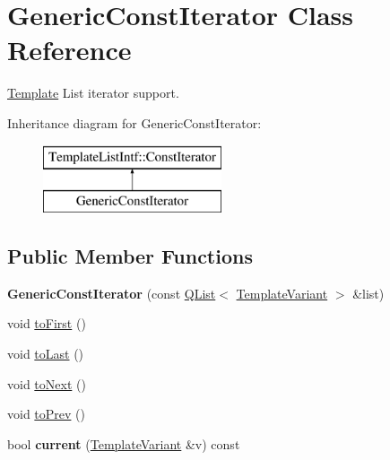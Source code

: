 \hypertarget{class_generic_const_iterator}{}\section{Generic\+Const\+Iterator Class Reference}
\label{class_generic_const_iterator}


\mbox{\hyperlink{class_template}{Template}} List iterator support.  


Inheritance diagram for Generic\+Const\+Iterator\+:\begin{figure}[H]
\begin{center}
\leavevmode
\includegraphics[height=2.000000cm]{class_generic_const_iterator}
\end{center}
\end{figure}
\subsection*{Public Member Functions}
\begin{DoxyCompactItemize}
\item 
\mbox{\label{class_generic_const_iterator_af36df491d68e9082bc00551bf09d7155}} 
{\bfseries Generic\+Const\+Iterator} (const \mbox{\hyperlink{class_q_list}{Q\+List}}$<$ \mbox{\hyperlink{class_template_variant}{Template\+Variant}} $>$ \&list)
\item 
void \mbox{\hyperlink{class_generic_const_iterator_abb4c60f119f4ad23523b96080cfabd3e}{to\+First}} ()
\item 
void \mbox{\hyperlink{class_generic_const_iterator_a53787d6c70cff35f1edb8b3ced0530aa}{to\+Last}} ()
\item 
void \mbox{\hyperlink{class_generic_const_iterator_a2ac3dc44a25c4790bd2a816b240f6a24}{to\+Next}} ()
\item 
void \mbox{\hyperlink{class_generic_const_iterator_aeafefa5d7969558a52c32817fd8e7457}{to\+Prev}} ()
\item 
\mbox{\label{class_generic_const_iterator_aca2af9b0f0ef4d137a768115e80f1cf5}} 
bool {\bfseries current} (\mbox{\hyperlink{class_template_variant}{Template\+Variant}} \&v) const
\end{DoxyCompactItemize}


